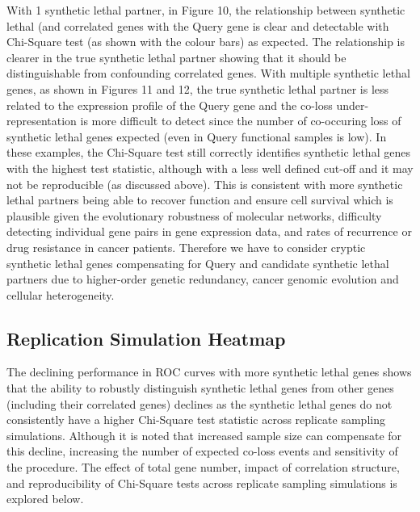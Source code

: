 With 1 synthetic lethal partner, in Figure 10, the relationship between synthetic lethal (and correlated genes with the Query gene is clear and detectable with Chi-Square test (as shown with the colour bars) as expected.  The relationship is clearer in the true synthetic lethal partner showing that it should be distinguishable from confounding correlated genes.  With multiple synthetic lethal genes, as shown in Figures 11 and 12, the true synthetic lethal partner is less related to the expression profile of the Query gene and the co-loss under-representation is more difficult to detect since the number of co-occuring loss of synthetic lethal genes expected (even in Query functional samples is low).  In these examples, the Chi-Square test still correctly identifies synthetic lethal genes with the highest test statistic, although with a less well defined cut-off and it may not be reproducible (as discussed above).  This is consistent with more synthetic lethal partners being able to recover function and ensure cell survival which is plausible given the evolutionary robustness of molecular networks, difficulty detecting individual gene pairs in gene expression data, and rates of recurrence or drug resistance in cancer patients.  Therefore we have to consider cryptic synthetic lethal genes compensating for Query and candidate synthetic lethal partners due to higher-order genetic redundancy, cancer genomic evolution and cellular heterogeneity.

\subsection{Replication Simulation Heatmap}

The declining performance in ROC curves with more synthetic lethal genes shows that the ability to robustly distinguish synthetic lethal genes from other genes (including their correlated genes) declines as the synthetic lethal genes do not consistently have a higher Chi-Square test statistic across replicate sampling simulations.  Although it is noted that increased sample size can compensate for this decline, increasing the number of expected co-loss events and sensitivity of the procedure.  The effect of total gene number, impact of correlation structure, and reproducibility of Chi-Square tests across replicate sampling simulations is explored below.

